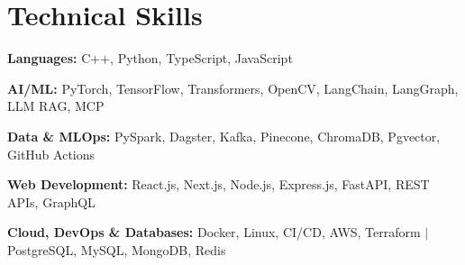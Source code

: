 \section{Technical Skills}
\begin{itemize}[leftmargin=0.15in, label={}, itemsep=1pt, parsep=0pt]
\small{
\item \textbf{Languages:} C++, Python, TypeScript, JavaScript
\item \textbf{AI/ML:} PyTorch, TensorFlow, Transformers, OpenCV, LangChain, LangGraph, LLM RAG, MCP
\item \textbf{Data \& MLOps:} PySpark, Dagster, Kafka, Pinecone, ChromaDB, Pgvector, GitHub Actions
\item \textbf{Web Development:} React.js, Next.js, Node.js, Express.js, FastAPI, REST APIs, GraphQL
\item \textbf{Cloud, DevOps \& Databases:} Docker, Linux, CI/CD, AWS, Terraform $|$ PostgreSQL, MySQL, MongoDB, Redis}
\end{itemize}
